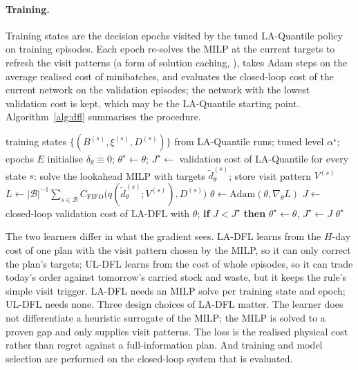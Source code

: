\paragraph{Training.} Training states are the decision epochs visited by the tuned LA-Quantile policy on training episodes. Each epoch re-solves the MILP at the current targets to refresh the visit patterns (a form of solution caching, \citealp{mulamba2021contrastive}), takes Adam steps on the average realised cost of minibatches, and evaluates the closed-loop cost of the current network on the validation episodes; the network with the lowest validation cost is kept, which may be the LA-Quantile starting point. Algorithm~\ref{alg:dfl} summarises the procedure.

\begin{algorithm}[H]
\caption{Training of decision-focused planning targets (LA-DFL)}\label{alg:dfl}
\small
\begin{algorithmic}[1]
\Require training states $\{(B^{(s)},\xi^{(s)},D^{(s)})\}$ from LA-Quantile runs; tuned level $\alpha^\star$; epochs $E$
\State initialise $\delta_\theta\equiv 0$; $\theta^\star\gets\theta$; $J^\star\gets$ validation cost of LA-Quantile
  \State for every state $s$: solve the lookahead MILP with targets $\tilde d_\theta^{(s)}$; store visit pattern $V^{(s)}$
    \State $L\gets |\mathcal B|^{-1}\sum_{s\in\mathcal B} C_{\mathrm{FIFO}}\big(q(\tilde d^{(s)}_\theta;V^{(s)}),D^{(s)}\big)$ 
    \State $\theta\gets\mathrm{Adam}(\theta,\nabla_\theta L)$
  \EndFor
  \State $J\gets$ closed-loop validation cost of LA-DFL with $\theta$; \textbf{if} $J<J^\star$ \textbf{then} $\theta^\star\gets\theta$, $J^\star\gets J$
\EndFor
\State \Return $\theta^\star$
\end{algorithmic}
\end{algorithm}

The two learners differ in what the gradient sees. LA-DFL learns from the $H$-day cost of one plan with the visit pattern chosen by the MILP, so it can only correct the plan's targets; UL-DFL learns from the cost of whole episodes, so it can trade today's order against tomorrow's carried stock and waste, but it keeps the rule's simple visit trigger. LA-DFL needs an MILP solve per training state and epoch; UL-DFL needs none. Three design choices of LA-DFL matter. The learner does not differentiate a heuristic surrogate of the MILP; the MILP is solved to a proven gap and only supplies visit patterns. The loss is the realised physical cost rather than regret against a full-information plan. And training and model selection are performed on the closed-loop system that is evaluated.
